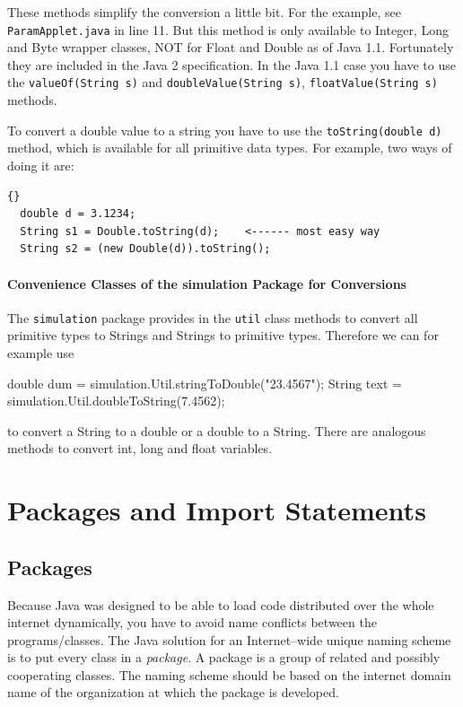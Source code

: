 These methods  simplify the conversion a little bit. For the example, see
\verb|ParamApplet.java| in line 11. But this method is only 
available to Integer, Long and Byte wrapper classes, NOT for
Float and Double as of Java 1.1. Fortunately they are included in the
Java 2 specification.
In the Java 1.1 case you have to use the \verb|valueOf(String s)| and
\verb|doubleValue(String s)|, \verb|floatValue(String s)| methods.

To convert a double value to a string you have to use the 
\verb|toString(double d)|
method, which is available for all primitive data types.
For example, two ways of doing it are:
\begin{lstlisting}{}
  double d = 3.1234;
  String s1 = Double.toString(d);    <------ most easy way
  String s2 = (new Double(d)).toString();
\end{lstlisting} 

\paragraph{Convenience Classes of the simulation Package for Conversions}
The \verb|simulation| package provides in the \verb|util| class methods
to convert all primitive types to Strings and Strings to primitive types.
Therefore we can for example use 
\begin{sverbatim}
  double dum = simulation.Util.stringToDouble("23.4567");
  String text = simulation.Util.doubleToString(7.4562);
\end{sverbatim}
to convert a String to a double or a double to a String. There are analogous
methods to convert int, long and float variables. 

\section{Packages and Import Statements}
\subsection{Packages}
Because Java was designed to be able to load code distributed
over the whole internet dynamically, you have to avoid name conflicts
between the programs/classes. The Java solution 
for an Internet--wide unique naming scheme is to put
every class in a \emph{package}. A package  is a group of related
and possibly cooperating classes. The naming scheme should be based on the
internet domain name of the organization at which the package is developed.

